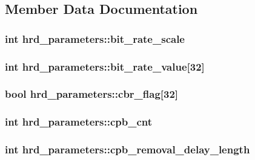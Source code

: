 \subsection{Member Data Documentation}
\hypertarget{structhrd__parameters_ace569254868da81da601fe785961eeab}{
\subsubsection[{bit\_\-rate\_\-scale}]{\setlength{\rightskip}{0pt plus 5cm}int {\bf hrd\_\-parameters::bit\_\-rate\_\-scale}}}
\label{structhrd__parameters_ace569254868da81da601fe785961eeab}
\hypertarget{structhrd__parameters_a201add02afdd5156e2559a0420c7ef0f}{
\subsubsection[{bit\_\-rate\_\-value}]{\setlength{\rightskip}{0pt plus 5cm}int {\bf hrd\_\-parameters::bit\_\-rate\_\-value}\mbox{[}32\mbox{]}}}
\label{structhrd__parameters_a201add02afdd5156e2559a0420c7ef0f}
\hypertarget{structhrd__parameters_aa759c54246d4b4a1ceecc44d56c352c5}{
\subsubsection[{cbr\_\-flag}]{\setlength{\rightskip}{0pt plus 5cm}bool {\bf hrd\_\-parameters::cbr\_\-flag}\mbox{[}32\mbox{]}}}
\label{structhrd__parameters_aa759c54246d4b4a1ceecc44d56c352c5}
\hypertarget{structhrd__parameters_a5c6bed7c8fb56f19fcc45d6b48da49af}{
\subsubsection[{cpb\_\-cnt}]{\setlength{\rightskip}{0pt plus 5cm}int {\bf hrd\_\-parameters::cpb\_\-cnt}}}
\label{structhrd__parameters_a5c6bed7c8fb56f19fcc45d6b48da49af}
\hypertarget{structhrd__parameters_a190beef0ba6621955e55235eaa3adf87}{
\subsubsection[{cpb\_\-removal\_\-delay\_\-length}]{\setlength{\rightskip}{0pt plus 5cm}int {\bf hrd\_\-parameters::cpb\_\-removal\_\-delay\_\-length}}}
